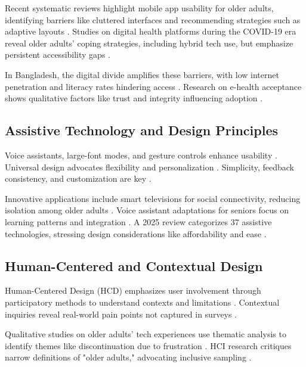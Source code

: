 \documentclass[acmlarge]{acmart}
\begin{document}
Recent systematic reviews highlight mobile app usability for older adults, identifying barriers like cluttered interfaces and recommending strategies such as adaptive layouts \cite{wang2025mobileappdesign}. Studies on digital health platforms during the COVID-19 era reveal older adults' coping strategies, including hybrid tech use, but emphasize persistent accessibility gaps \cite{smith2024digitalhealth}.

In Bangladesh, the digital divide amplifies these barriers, with low internet penetration and literacy rates hindering access \cite{rahman2021digitalinequality}. Research on e-health acceptance shows qualitative factors like trust and integrity influencing adoption \cite{ahmed2022ehealth}.

\subsection{Assistive Technology and Design Principles}
Voice assistants, large-font modes, and gesture controls enhance usability \cite{smith2019voiceui, zhao2020voiceassist, kalantari2021assistive}. Universal design advocates flexibility and personalization \cite{bennett2020inclusive, chang2023smartaging, mace1997universal}. Simplicity, feedback consistency, and customization are key \cite{norman2016accessible, fisk2009designing, czaja2019aging}.

Innovative applications include smart televisions for social connectivity, reducing isolation among older adults \cite{kim2025smarttv}. Voice assistant adaptations for seniors focus on learning patterns and integration \cite{lopez2025voiceassist}. A 2025 review categorizes 37 assistive technologies, stressing design considerations like affordability and ease \cite{patel2025assistivetech}.

\subsection{Human-Centered and Contextual Design}
Human-Centered Design (HCD) emphasizes user involvement through participatory methods to understand contexts and limitations \cite{norman2013design, ideo2015hcd, buxton2007sketching}. Contextual inquiries reveal real-world pain points not captured in surveys \cite{brown2022contextual, holtzblatt2014contextual, beyer1997contextual}.

Qualitative studies on older adults' tech experiences use thematic analysis to identify themes like discontinuation due to frustration \cite{johnson2023discontinuation}. HCI research critiques narrow definitions of "older adults," advocating inclusive sampling \cite{turner2018hcichallenges}.
\end{document}
